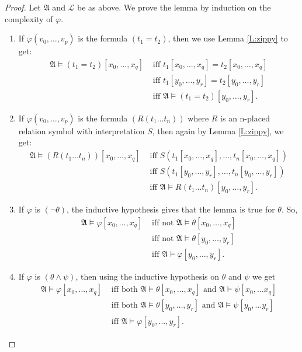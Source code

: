 \documentclass[titlepage, oneside]{amsbook}
\theoremstyle{plain}
\theoremstyle{definition}
\theoremstyle{remark}
\newcommand{\lan}{\ensuremath{\mathcal{L}}}
\newcommand{\ma}{\ensuremath{\mathfrak{A}}}
\newcommand{\ynot}[2][0]{\ensuremath{ y_{#1} , \dots , y_{#2}}}
\begin{document}
\begin{proof} Let $\ma$ and $\lan$ be as above.  We prove the lemma by
induction on the complexity of $\varphi$.

\begin{enumerate}
\item If $\varphi(v_{0}, \dots ,v_{p})$ is the  formula $(t_{1} = t_{2})$, then we use Lemma \ref{L:zippy} to get:
\[ \begin{aligned}
\mathfrak{A} \models (t_{1} = t_{2})[x_{0}, \dots , x_{q}]  &
\mbox{ iff  } t_{1}[x_{0}, \dots ,x_{q}] = t_{2}[x_{0}, \dots ,x_{q}]\\
%
& \mbox{ iff }
t_{1}[y_{0}, \dots ,y_{r}] = t_{2}[y_{0}, \dots ,y_{r}]\\
%
& \mbox{ iff } \mathfrak{A} \models (t_{1} = t_{2})[y_{0}, \dots
, y_{r}].
\end{aligned} \]

\item If $\varphi (v_{0}, \dots ,v_{p})$ is the  formula 
$(R(t_{1} \dots t_{n})) $ where $R$ is an n-placed relation symbol
with interpretation $S$, then
again by Lemma \ref{L:zippy}, we get:
\[ \begin{aligned}
\mathfrak{A} \models (R(t_{1} \dots  t_{n}))[x_{0} , \dots , x_{q}] 
& \mbox{ iff } S(t_{1}[x_{0}, \dots ,x_{q}], \dots , t_{n}[x_{0}, \dots 
,x_{q}]) \\
& \mbox{ iff } S(t_{1}[y_{0}, \dots ,y_{r}], \dots , t_{n}[y_{0}, \dots
,y_{r}]) \\
& \mbox{ iff } \ma \models R ( t_1  \dots  t_n ) [ \ynot{r} ].
\end{aligned} \]


\item If $\varphi$ is $( \neg \theta ) $, the inductive hypothesis
gives that the lemma is true for $\theta$. So,  
\[ \begin{aligned}
\mathfrak{A} \models \varphi [x_{0}, \dots ,x_{q}]
&  \mbox{ iff not } \mathfrak{A} \models \theta[x_{0}, \dots ,x_{q}] \\
&  \mbox{ iff not } \mathfrak{A} \models \theta[y_{0}, \dots ,y_{r}] \\
& \mbox{ iff } \mathfrak{A} \models \varphi [y_{0}, \dots ,y_{r}].
\end{aligned} \]

\item If $\varphi$ is $( \theta \wedge \psi)$, then using the inductive
hypothesis on $\theta$ and $\psi$ we get 
\[ \begin{aligned}
 \mathfrak{A} \models \varphi [x_{0}, \dots ,x_{q} ]
 &\mbox{ iff both } 
\mathfrak{A} \models \theta [x_{0} , \dots , x_{q}] \mbox{ and }
\mathfrak{A} \models \psi [x_{0}, \dots x_{q}] \\
 &\mbox{ iff both }
\mathfrak{A} \models \theta [y_{0} , \dots , y_{r}] \mbox{ and }
\mathfrak{A} \models \psi [y_{0}, \dots y_{r}] \\ 
& \mbox{ iff } \mathfrak{A} \models \varphi [y_{0}, \dots ,y_{r} ].
\end{aligned} \]


\end{enumerate}
\end{proof}
\end{document}
